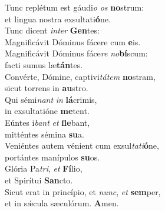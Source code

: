\evenverse Tunc replétum est gáudi\textit{o} \textit{os} \textbf{no}strum:~\*\\
\evenverse et lingua nostra exsultati\textbf{ó}ne.\\
\oddverse Tunc dicent \textit{in}\textit{ter} \textbf{Gen}tes:~\*\\
\oddverse Magnificávit Dóminus fácere cum \textbf{e}is.\\
\evenverse Magnificávit Dóminus fáce\textit{re} \textit{no}\textbf{bí}scum:~\*\\
\evenverse facti sumus læ\textbf{tán}tes.\\
\oddverse Convérte, Dómine, captivi\textit{tá}\textit{tem} \textbf{no}stram,~\*\\
\oddverse sicut torrens in \textbf{au}stro.\\
\evenverse Qui sémi\textit{nant} \textit{in} \textbf{lá}crimis,~\*\\
\evenverse in exsultatióne \textbf{me}tent.\\
\oddverse Eúntes i\textit{bant} \textit{et} \textbf{fle}bant,~\*\\
\oddverse mitténtes sémina \textbf{su}a.\\
\evenverse Veniéntes autem vénient cum exsul\textit{ta}\textit{ti}\textbf{ó}ne,~\*\\
\evenverse portántes manípulos \textbf{su}os.\\
\oddverse Glória Pa\textit{tri}, \textit{et} \textbf{Fí}lio,~\*\\
\oddverse et Spirítui \textbf{San}cto.\\
\evenverse Sicut erat in princípio, et \textit{nunc}, \textit{et} \textbf{sem}per,~\*\\
\evenverse et in sǽcula sæculórum. \textbf{A}men.\\
